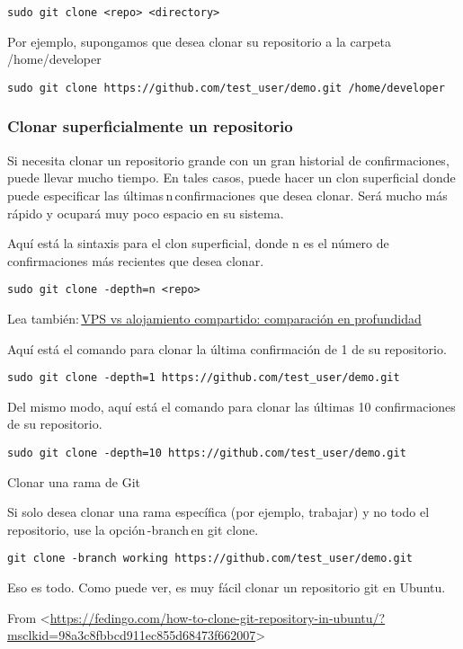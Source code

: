 \documentclass[
  a2paper,
]{article}
\begin{document}
\texttt{sudo\ git\,clone\,\textless{}repo\textgreater{}\,\textless{}directory\textgreater{}}

Por ejemplo, supongamos que desea clonar su repositorio a la carpeta
/home/developer

\texttt{sudo\ git\ clone~https://github.com/test\_user/demo.git~/home/developer}

\hypertarget{clonar-superficialmente-un-repositorio}{%
\subsubsection{Clonar superficialmente un
repositorio}\label{clonar-superficialmente-un-repositorio}}

Si necesita clonar un repositorio grande con un gran historial de
confirmaciones, puede llevar mucho tiempo. En tales casos, puede hacer
un clon superficial donde puede especificar las
últimas\,n\,confirmaciones que desea clonar. Será mucho más rápido y
ocupará muy poco espacio en su sistema.

Aquí está la sintaxis para el clon superficial, donde n es el número de
confirmaciones más recientes que desea clonar.

\texttt{sudo\ git\,clone\,-depth=n\,\textless{}repo\textgreater{}}

Lea
también:\,\href{https://fedingo.com/vps-vs-shared-hosting-in-depth-comparison/}{VPS
vs alojamiento compartido: comparación en profundidad}

Aquí está el comando para clonar la última confirmación de 1 de su
repositorio.

\texttt{sudo\ git\ clone\ -depth=1~https://github.com/test\_user/demo.git}

Del mismo modo, aquí está el comando para clonar las últimas 10
confirmaciones de su repositorio.

\texttt{sudo\ git\ clone\ -depth=10~https://github.com/test\_user/demo.git}

Clonar una rama de Git

Si solo desea clonar una rama específica (por ejemplo, trabajar) y no
todo el repositorio, use la opción\,-branch\,en git clone.

\texttt{git\,clone\,-branch\,working~https://github.com/test\_user/demo.git}

Eso es todo. Como puede ver, es muy fácil clonar un repositorio git en
Ubuntu.

From
\textless{}\url{https://fedingo.com/how-to-clone-git-repository-in-ubuntu/?msclkid=98a3c8fbbcd911ec855d68473f662007}\textgreater{}
\end{document}

